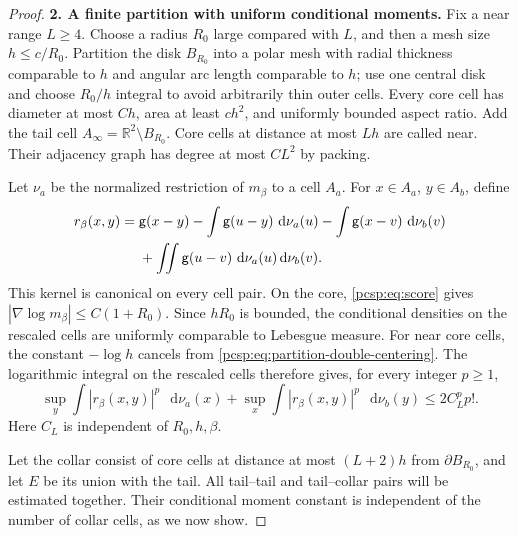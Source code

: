 \documentclass[11pt,reqno]{amsart}
\numberwithin{equation}{section}
\theoremstyle{plain}
\theoremstyle{definition}
\newcommand{\dd}{\mathop{}\!\mathrm d}
\newcommand{\be}{\beta}
\newcommand{\g}{\mathsf g}
\newcommand{\step}[1]{\par\medskip\noindent\textbf{#1}}
\begin{document}
\begin{proof}
\step{2. A finite partition with uniform conditional moments.}
Fix a near range $L\geq4$. Choose a radius $R_0$ large compared with $L$, and then a mesh size $h\leq c/R_0$. Partition the disk $B_{R_0}$ into a polar mesh with radial thickness comparable to $h$ and angular arc length comparable to $h$; use one central disk and choose $R_0/h$ integral to avoid arbitrarily thin outer cells. Every core cell has diameter at most $Ch$, area at least $ch^2$, and uniformly bounded aspect ratio. Add the tail cell $A_\infty=\mathbb R^2\setminus B_{R_0}$. Core cells at distance at most $Lh$ are called near. Their adjacency graph has degree at most $C L^2$ by packing.

Let $\nu_a$ be the normalized restriction of $m_\be$ to a cell $A_a$. For $x\in A_a$, $y\in A_b$, define
\begin{align}\label{pcsp:eq:partition-double-centering}
 r_\be(x,y)={}&\g(x-y)-\int\g(u-y)\,\dd\nu_a(u)
                 -\int\g(x-v)\,\dd\nu_b(v)\notag\\
 &+\iint\g(u-v)\,\dd\nu_a(u)\dd\nu_b(v).
\end{align}
This kernel is canonical on every cell pair. On the core, \eqref{pcsp:eq:score} gives $|\nabla\log m_\be|\leq C(1+R_0)$. Since $hR_0$ is bounded, the conditional densities on the rescaled cells are uniformly comparable to Lebesgue measure. For near core cells, the constant $-\log h$ cancels from \eqref{pcsp:eq:partition-double-centering}. The logarithmic integral on the rescaled cells therefore gives, for every integer $p\geq1$,
\begin{equation}\label{pcsp:eq:partition-near-moments}
 \sup_y\int|r_\be(x,y)|^p\,\dd\nu_a(x)
 +\sup_x\int|r_\be(x,y)|^p\,\dd\nu_b(y)
 \leq 2 C_L^p p!.
\end{equation}
Here $C_L$ is independent of $R_0,h,\be$.

Let the collar consist of core cells at distance at most $(L+2)h$ from $\partial B_{R_0}$, and let $E$ be its union with the tail. All tail--tail and tail--collar pairs will be estimated together. Their conditional moment constant is independent of the number of collar cells, as we now show.


\end{proof}
\end{document}
